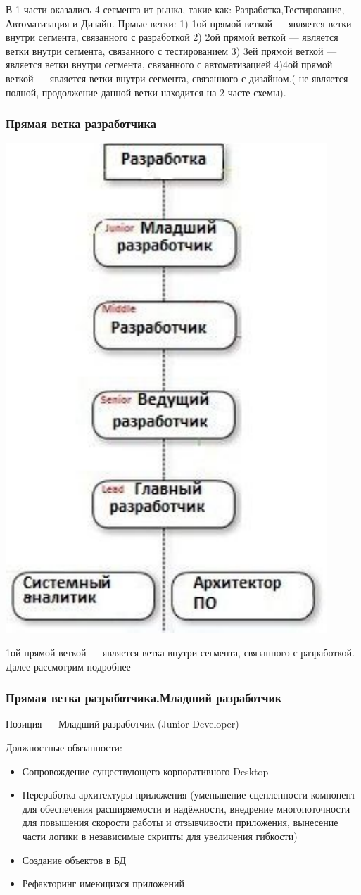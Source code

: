 \documentclass{../industrial-development}
\begin{document}
\lecturenotes
В 1 части оказались 4 сегмента ит рынка, такие как: Разработка,Тестирование, Автоматизация и Дизайн.
Прмые ветки:
1) 1ой прямой веткой --- является ветки внутри сегмента, связанного с разработкой
2) 2ой прямой веткой  --- является ветки внутри сегмента, связанного с тестированием
3) 3ей прямой веткой --- является ветки внутри сегмента, связанного с автоматизацией
4)4ой прямой веткой --- является ветки внутри сегмента, связанного с дизайном.( не является полной, продолжение данной ветки находится на 2 часте схемы).

\begin{frame} \frametitle{Прямая ветка разработчика}
 \centerline{\includegraphics[width=0.46\linewidth]{11-IT-specialist's-way/sch11a.pdf}}
\end{frame}

\lecturenotes
 1ой прямой веткой --- является ветка внутри сегмента, связанного с разработкой. Далее рассмотрим подробнее

\begin{frame} \frametitle{Прямая ветка разработчика.Младший разработчик}
 \begin{block}{}
  \alert{Позиция --- Младший разработчик (Junior Developer)}

Должностные обязанности: 
  \end{block}
  \begin{itemize}
  \item Сопровождение существующего корпоративного Desktop
  \item Переработка архитектуры приложения (уменьшение сцепленности компонент для обеспечения расширяемости и надёжности, внедрение многопоточности для повышения скорости работы и отзывчивости приложения, вынесение части логики в независимые скрипты для увеличения гибкости)
  \item Создание объектов в БД
 \item Рефакторинг имеющихся приложений
  \end{itemize}
\end{frame}
\end{document}
